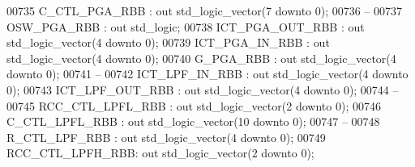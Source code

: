 \begin{DoxyCode}
00735         C\_CTL\_PGA\_RBB           : \textcolor{keywordflow}{out} \textcolor{comment}{std\_logic\_vector}(\textcolor{vhdllogic}{}\textcolor{vhdllogic}{7} \textcolor{keywordflow}{downto} \textcolor{vhdllogic}{}\textcolor{vhdllogic}{0});
00736 \textcolor{keyword}{        --}
00737         OSW\_PGA\_RBB         : \textcolor{keywordflow}{out} \textcolor{comment}{std\_logic};
00738         ICT\_PGA\_OUT\_RBB : \textcolor{keywordflow}{out} \textcolor{comment}{std\_logic\_vector}(\textcolor{vhdllogic}{}\textcolor{vhdllogic}{4} \textcolor{keywordflow}{downto} \textcolor{vhdllogic}{}\textcolor{vhdllogic}{0});
00739         ICT\_PGA\_IN\_RBB  : \textcolor{keywordflow}{out} \textcolor{comment}{std\_logic\_vector}(\textcolor{vhdllogic}{}\textcolor{vhdllogic}{4} \textcolor{keywordflow}{downto} \textcolor{vhdllogic}{}\textcolor{vhdllogic}{0});
00740         G\_PGA\_RBB               : \textcolor{keywordflow}{out} \textcolor{comment}{std\_logic\_vector}(\textcolor{vhdllogic}{}\textcolor{vhdllogic}{4} \textcolor{keywordflow}{downto} \textcolor{vhdllogic}{}\textcolor{vhdllogic}{0});
00741 \textcolor{keyword}{        --}
00742         ICT\_LPF\_IN\_RBB      : \textcolor{keywordflow}{out} \textcolor{comment}{std\_logic\_vector}(\textcolor{vhdllogic}{}\textcolor{vhdllogic}{4} \textcolor{keywordflow}{downto} \textcolor{vhdllogic}{}\textcolor{vhdllogic}{0});
00743         ICT\_LPF\_OUT\_RBB     : \textcolor{keywordflow}{out} \textcolor{comment}{std\_logic\_vector}(\textcolor{vhdllogic}{}\textcolor{vhdllogic}{4} \textcolor{keywordflow}{downto} \textcolor{vhdllogic}{}\textcolor{vhdllogic}{0});
00744 \textcolor{keyword}{        --}
00745         RCC\_CTL\_LPFL\_RBB    : \textcolor{keywordflow}{out} \textcolor{comment}{std\_logic\_vector}(\textcolor{vhdllogic}{}\textcolor{vhdllogic}{2} \textcolor{keywordflow}{downto} \textcolor{vhdllogic}{}\textcolor{vhdllogic}{0});
00746         C\_CTL\_LPFL\_RBB      : \textcolor{keywordflow}{out} \textcolor{comment}{std\_logic\_vector}(\textcolor{vhdllogic}{}\textcolor{vhdllogic}{10} \textcolor{keywordflow}{downto} \textcolor{vhdllogic}{}\textcolor{vhdllogic}{0});
00747 \textcolor{keyword}{        --}
00748         R\_CTL\_LPF\_RBB       : \textcolor{keywordflow}{out} \textcolor{comment}{std\_logic\_vector}(\textcolor{vhdllogic}{}\textcolor{vhdllogic}{4} \textcolor{keywordflow}{downto} \textcolor{vhdllogic}{}\textcolor{vhdllogic}{0});
00749         RCC\_CTL\_LPFH\_RBB: \textcolor{keywordflow}{out} \textcolor{comment}{std\_logic\_vector}(\textcolor{vhdllogic}{}\textcolor{vhdllogic}{2} \textcolor{keywordflow}{downto} \textcolor{vhdllogic}{}\textcolor{vhdllogic}{0});

\end{DoxyCode}

